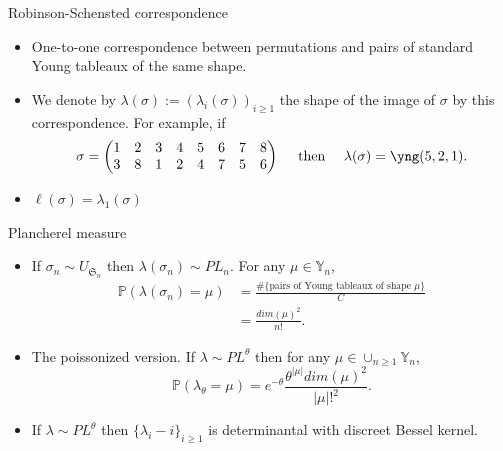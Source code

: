 \documentclass[english]{beamer}
\begin{document}
\begin{frame}{Robinson-Schensted correspondence}
\begin{itemize}
 
    \item One-to-one correspondence between permutations and pairs of standard Young tableaux of the same shape. 
    \item We denote by $\lambda(\sigma):=(\lambda_i(\sigma))_{i\geq1}$ the shape of the image of  $\sigma$ by this correspondence. 
    For example, if $$\sigma = \begin{pmatrix} 
1 & 2 & 3 & 4 & 5 & 6 & 7 & 8 \\
3 & 8 & 1 & 2 & 4 & 7 & 5 & 6
  \end{pmatrix}  \quad \text { then } \quad \lambda(\sigma)=\yng(5,2,1).$$ 

    \item $\ell(\sigma)=\lambda_1(\sigma)$
\end{itemize}    
\end{frame}

\begin{frame}{Plancherel measure}
\vspace{4 mm}

\begin{itemize}
    \item If $\sigma_n \sim {U}_{\mathfrak{S}_n}$ then $ \lambda(\sigma_n) \sim PL_n$. For any $\mu \in \mathbb{Y}_n$,
    \begin{align*}
    \mathbb{P}(\lambda(\sigma_n)=\mu)&=\frac{\#\{\text{pairs of Young tableaux of shape } \mu\}}{C}\\&=\frac{dim(\mu)^2}{n!}. 
    \end{align*}
    \item The poissonized version. If $ \lambda \sim PL^\theta$ then  for any $\mu \in \cup_{n\geq 1}\mathbb{Y}_n$,
$$    \mathbb{P}(\lambda_\theta=\mu) = e^{-\theta}\frac{\theta^{|\mu|}dim(\mu)^2}{|\mu|!^2}.$$
\item  If  $\lambda \sim PL^\theta$ then $\{\lambda_i-i\}_{i\geq1}$ is determinantal with discreet Bessel kernel. 
\end{itemize}

\end{frame}
\end{document}
